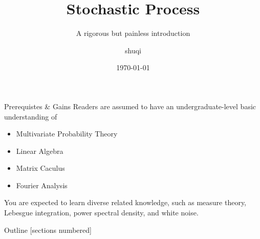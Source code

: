\documentclass[utf-8, 10pt, aspectratio=1610]{beamer}
\title{Stochastic Process}
\subtitle{A rigorous but painless introduction}
\author{shuqi}
\date{\today}
\institute{
    \faGithub\;
    \href{https://github.com/xiaosq2000}{xiaosq2000}
    \quad
    \faEnvelope\;
    \href{xiaosq2000@gmail.com}{xiaosq2000@gmail.com}
}
\begin{document}
\begin{frame}
	\titlepage
\end{frame}

\begin{frame}{Prerequistes \& Gains}
	Readers are assumed to have an undergraduate-level basic understanding of
	\begin{itemize}
		\item Multivariate Probability Theory
		\item Linear Algebra
		\item Matrix Caculus
		\item Fourier Analysis
	\end{itemize}
	\vspace*{\fill}
	\par You are expected to learn diverse related knowledge, such as measure theory, Lebesgue integration, power spectral density, and white noise.
\end{frame}

\begin{frame}{Outline}
	[sections numbered]
	\tableofcontents
\end{frame}
\end{document}

